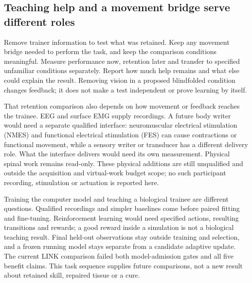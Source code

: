 \subsection{Teaching help and a movement bridge serve different roles}

Remove trainer information to test what was retained. Keep any movement bridge
needed to perform the task, and keep the comparison conditions meaningful.
Measure performance now, retention later and transfer to specified unfamiliar
conditions separately. Report how much help remains and what else could explain
the result. Removing vision in a proposed blindfolded condition changes feedback;
it does not make a test independent or prove learning by itself.

That retention comparison also depends on how movement or feedback reaches the
trainee. EEG and surface EMG supply recordings. A future body writer would need
a separate qualified interface: neuromuscular electrical stimulation (NMES)
and functional electrical stimulation (FES) can cause contractions or functional
movement, while a sensory writer or transducer has a different delivery role.
What the interface delivers would need its own measurement. Physical spinal
work remains read-only. These physical additions are still unqualified and
outside the acquisition and virtual-work budget scope; no such participant
recording, stimulation or actuation is reported here.

Training the computer model and teaching a biological trainee are different
questions. Qualified recordings and simpler baselines come before paired fitting
and fine-tuning. Reinforcement learning would need specified actions, resulting
transitions and rewards; a good reward inside a simulation is not a biological
teaching result. Final held-out observations stay outside training and selection,
and a frozen running model stays separate from a candidate adaptive update. The
current LINK comparison failed both model-admission gates and all five benefit
claims. This task sequence supplies future comparisons, not a new result about
retained skill, repaired tissue or a cure.
